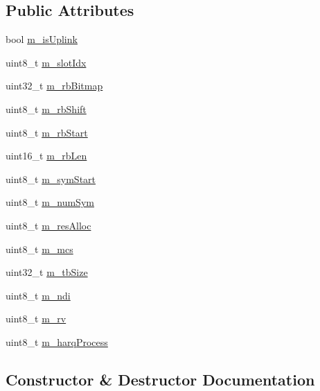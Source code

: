 \subsection*{Public Attributes}
\begin{DoxyCompactItemize}
\item 
bool \hyperlink{structns3_1_1TbInfoElement_a9fe1c25504c5e8e9ea15aa6f1730d858}{m\+\_\+is\+Uplink}
\item 
uint8\+\_\+t \hyperlink{structns3_1_1TbInfoElement_a1d889a4235207dc0a3259fb8a6a877ed}{m\+\_\+slot\+Idx}
\item 
uint32\+\_\+t \hyperlink{structns3_1_1TbInfoElement_aa5887329d83d8a695c6d5dc3e16f8b8f}{m\+\_\+rb\+Bitmap}
\item 
uint8\+\_\+t \hyperlink{structns3_1_1TbInfoElement_acdd5fce91b2b2337753dba60f953032f}{m\+\_\+rb\+Shift}
\item 
uint8\+\_\+t \hyperlink{structns3_1_1TbInfoElement_a4881d9b0933cfffa6ff36d88bfefe532}{m\+\_\+rb\+Start}
\item 
uint16\+\_\+t \hyperlink{structns3_1_1TbInfoElement_aa4a0ddadaf50972d88955feb82ff1f3d}{m\+\_\+rb\+Len}
\item 
uint8\+\_\+t \hyperlink{structns3_1_1TbInfoElement_adf8b261dbc9bb2382feaa07863cbc0b5}{m\+\_\+sym\+Start}
\item 
uint8\+\_\+t \hyperlink{structns3_1_1TbInfoElement_a4529fa3c2e3bcafb7321713b4fc163d7}{m\+\_\+num\+Sym}
\item 
uint8\+\_\+t \hyperlink{structns3_1_1TbInfoElement_ab2225f005287bc5c21030d3801037b40}{m\+\_\+res\+Alloc}
\item 
uint8\+\_\+t \hyperlink{structns3_1_1TbInfoElement_a3e4517ef4f283397c97528fe277274da}{m\+\_\+mcs}
\item 
uint32\+\_\+t \hyperlink{structns3_1_1TbInfoElement_a4749ae09553dba816f6fc35ff766484a}{m\+\_\+tb\+Size}
\item 
uint8\+\_\+t \hyperlink{structns3_1_1TbInfoElement_a659d4b911d32d99d5c04230f3e33003f}{m\+\_\+ndi}
\item 
uint8\+\_\+t \hyperlink{structns3_1_1TbInfoElement_a573abe0c57b3c89a520588f30dc71347}{m\+\_\+rv}
\item 
uint8\+\_\+t \hyperlink{structns3_1_1TbInfoElement_a8a7bdb6091a95a6ac232873068f0c5df}{m\+\_\+harq\+Process}
\end{DoxyCompactItemize}


\subsection{Constructor \& Destructor Documentation}
